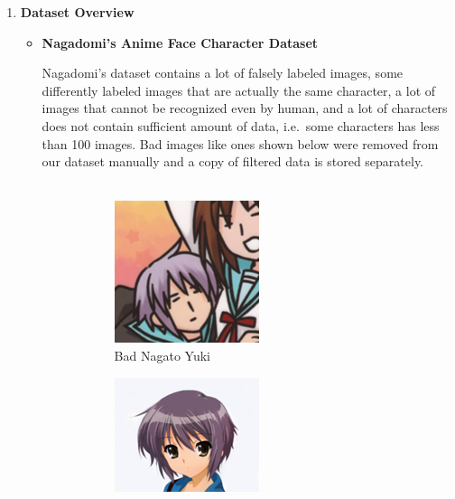 \documentclass[11.5pt]{article}
\begin{document}
    \begin{enumerate}
        \item \textbf{Dataset Overview}
        \begin{itemize}
            \item \textbf{Nagadomi's Anime Face Character Dataset}

            Nagadomi's dataset contains a lot of falsely labeled images, some differently labeled images that are actually the same character, a lot of images that cannot be recognized even by human, and a lot of characters does not contain sufficient amount of data, i.e.\ some characters has less than 100 images.
            Bad images like ones shown below were removed from our dataset manually and a copy of filtered data is stored separately.\\ \\
            \begin{figure}[h!]
                \begin{subfigure}[h]{0.5\linewidth}
                    \centering
                    \includegraphics[width=0.5\linewidth, scale=0.5]{images/face_145_303_113.png}
                    \caption{Bad Nagato Yuki}
                \end{subfigure}
                \begin{subfigure}[h]{0.5\linewidth}
                    \centering
                    \includegraphics[width=0.5\linewidth, scale=0.5]{images/face_235_235_128.png}

\end{subfigure}
\end{figure}
\end{itemize}
\end{enumerate}
\end{document}
